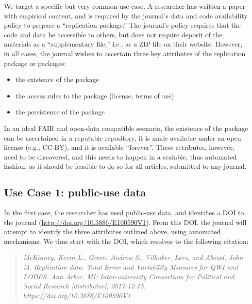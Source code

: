 We target a specific but very common use case. A researcher has written a paper with empirical content, and is required by the journal's data and code availability policy to prepare a ``replication package.'' The journal's policy requires that the code and data be accessible to others, but does not require deposit of the materials as a ``supplementary file,'' i.e., as a ZIP file on their website. However, in all cases, the journal wishes to ascertain three key attributes of the replication package or packages:
\begin{itemize}
    \item the existence of the package
    \item the access rules to the package (license, terms of use)
    \item the persistence of the package
\end{itemize}
In an ideal \ac{FAIR} and open-data compatible scenario, the existence of the package can be ascertained in a reputable repository, it is made available under an open license (e.g., CC-BY), and it is available ``forever''. These attributes, however, need to be discovered, and this needs to happen in a scalable, thus automated fashion, as it should be feasible to do so for all articles, submitted to any journal. 

\subsection{Use Case 1: public-use data}
In the first case, the researcher has  used public-use data, and identifies a \ac{DOI} to the journal (\url{http://doi.org/10.3886/E100590V1}). From this \ac{DOI}, the journal will attempt to identify the three attributes outlined above, using automated mechanisms. We thus start with the \ac{DOI}, which resolves to the following citation:

\begin{quote}
	\it
McKinney, Kevin L., Green, Andrew S., Vilhuber, Lars, and Abowd, John M. Replication data: Total Error and Variability Measures for QWI and LODES. Ann Arbor, MI: Inter-university Consortium for Political and Social Research [distributor], 2017-12-15. https://doi.org/10.3886/E100590V1
\end{quote}


